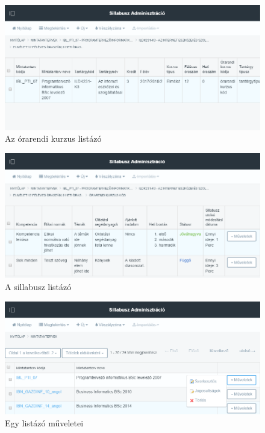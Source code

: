 \documentclass[hidelinks, 12pt, a4paper]{report}
\begin{document}
\begin{figure}[H]
    \centering
	\includegraphics[width=\textwidth]{sm_timetable_course_list.png}
	\caption{Az órarendi kurzus listázó}
\end{figure}

\begin{figure}[H]
    \centering
	\includegraphics[width=\textwidth]{sm_syllabus_list.png}
	\caption{A sillabusz listázó}
\end{figure}

\begin{figure}[H]
    \centering
	\includegraphics[width=\textwidth]{sm_list_actions.png}
	\caption{Egy listázó műveletei}
\end{figure}
\end{document}
